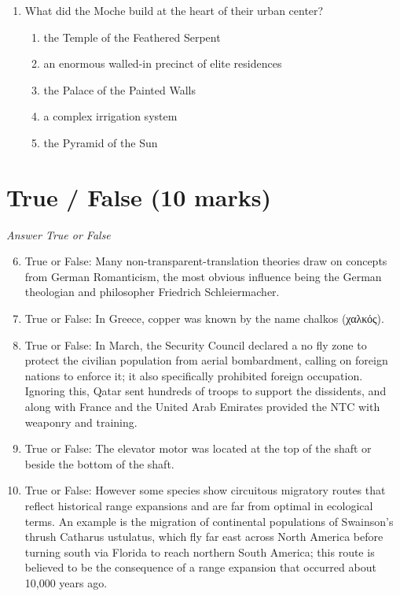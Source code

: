 \documentclass[12pt]{article}
\begin{document}
\begin{enumerate}[label=\arabic*.]
\begin{enumerate}[label=(\alph*)]
    \item within the past 12,000 years
    \item within the past 1,000 years
    \item within the past 24,000 years
    \item within the past 2,000 years
    \item within the past 6,000 years
\end{enumerate}
\item What did the Moche build at the heart of their urban center?
\begin{enumerate}[label=(\alph*)]
    \item the Temple of the Feathered Serpent
    \item an enormous walled-in precinct of elite residences
    \item the Palace of the Painted Walls
    \item a complex irrigation system
    \item the Pyramid of the Sun
\end{enumerate}
\end{enumerate}

\section*{True / False (10 marks)}
\textit{Answer True or False}
\begin{enumerate}[label=\arabic*.]
\setcounter{enumi}{5}
\item True or False: Many non-transparent-translation theories draw on concepts from German Romanticism, the most obvious influence being the German theologian and philosopher Friedrich Schleiermacher.
\item True or False: In Greece, copper was known by the name chalkos (χαλκός).
\item True or False: In March, the Security Council declared a no fly zone to protect the civilian population from aerial bombardment, calling on foreign nations to enforce it; it also specifically prohibited foreign occupation. Ignoring this, Qatar sent hundreds of troops to support the dissidents, and along with France and the United Arab Emirates provided the NTC with weaponry and training.
\item True or False: The elevator motor was located at the top of the shaft or beside the bottom of the shaft.
\item True or False: However some species show circuitous migratory routes that reflect historical range expansions and are far from optimal in ecological terms. An example is the migration of continental populations of Swainson's thrush Catharus ustulatus, which fly far east across North America before turning south via Florida to reach northern South America; this route is believed to be the consequence of a range expansion that occurred about 10,000 years ago.
\end{enumerate}
\end{document}
